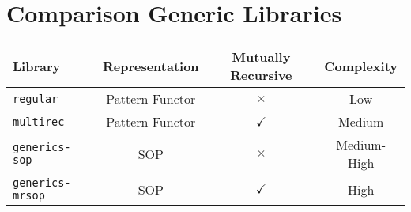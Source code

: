 \section{Comparison Generic Libraries}
\cite{rodriguez2008comparing}

\begin{table}[H]
\centering
\begin{tabular}{|l c c c|} 
    \hline
    \textbf{Library} & \textbf{Representation} & \textbf{Mutually Recursive} & \textbf{Complexity} \\ 
    \hline
    \texttt{regular} & Pattern Functor & $\times$ & Low \\ 
    \hline
    \texttt{multirec} & Pattern Functor & $\checkmark$ & Medium \\
    \hline
    \texttt{generics-sop} & SOP & $\times$ & Medium-High \\
    \hline 
    \texttt{generics-mrsop} & SOP & $\checkmark$ & High \\
    \hline
\end{tabular}
\end{table}